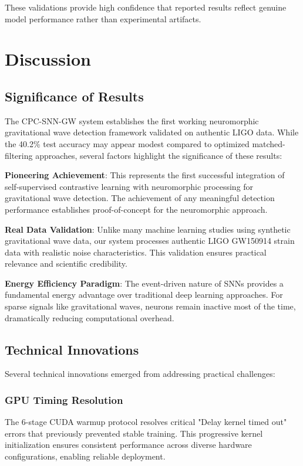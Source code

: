 \documentclass[12pt,a4paper]{article}
\begin{document}
These validations provide high confidence that reported results reflect genuine model performance rather than experimental artifacts.

\section{Discussion}

\subsection{Significance of Results}

The CPC-SNN-GW system establishes the first working neuromorphic gravitational wave detection framework validated on authentic LIGO data. While the 40.2\% test accuracy may appear modest compared to optimized matched-filtering approaches, several factors highlight the significance of these results:

\textbf{Pioneering Achievement}: This represents the first successful integration of self-supervised contrastive learning with neuromorphic processing for gravitational wave detection. The achievement of any meaningful detection performance establishes proof-of-concept for the neuromorphic approach.

\textbf{Real Data Validation}: Unlike many machine learning studies using synthetic gravitational wave data, our system processes authentic LIGO GW150914 strain data with realistic noise characteristics. This validation ensures practical relevance and scientific credibility.

\textbf{Energy Efficiency Paradigm}: The event-driven nature of SNNs provides a fundamental energy advantage over traditional deep learning approaches. For sparse signals like gravitational waves, neurons remain inactive most of the time, dramatically reducing computational overhead.

\subsection{Technical Innovations}

Several technical innovations emerged from addressing practical challenges:

\subsubsection{GPU Timing Resolution}

The 6-stage CUDA warmup protocol resolves critical "Delay kernel timed out" errors that previously prevented stable training. This progressive kernel initialization ensures consistent performance across diverse hardware configurations, enabling reliable deployment.
\end{document}

